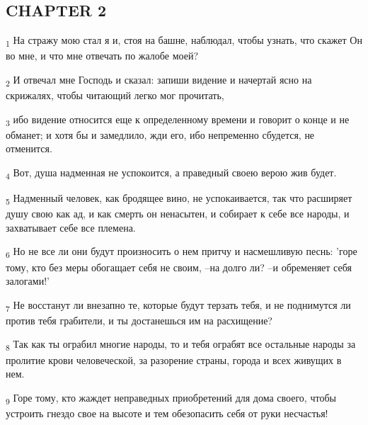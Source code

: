 \subsection{CHAPTER 2}
\begin{tcolorbox}
\textsubscript{1} На стражу мою стал я и, стоя на башне, наблюдал, чтобы узнать, что скажет Он во мне, и что мне отвечать по жалобе моей?
\end{tcolorbox}
\begin{tcolorbox}
\textsubscript{2} И отвечал мне Господь и сказал: запиши видение и начертай ясно на скрижалях, чтобы читающий легко мог прочитать,
\end{tcolorbox}
\begin{tcolorbox}
\textsubscript{3} ибо видение относится еще к определенному времени и говорит о конце и не обманет; и хотя бы и замедлило, жди его, ибо непременно сбудется, не отменится.
\end{tcolorbox}
\begin{tcolorbox}
\textsubscript{4} Вот, душа надменная не успокоится, а праведный своею верою жив будет.
\end{tcolorbox}
\begin{tcolorbox}
\textsubscript{5} Надменный человек, как бродящее вино, не успокаивается, так что расширяет душу свою как ад, и как смерть он ненасытен, и собирает к себе все народы, и захватывает себе все племена.
\end{tcolorbox}
\begin{tcolorbox}
\textsubscript{6} Но не все ли они будут произносить о нем притчу и насмешливую песнь: 'горе тому, кто без меры обогащает себя не своим, --на долго ли? --и обременяет себя залогами!'
\end{tcolorbox}
\begin{tcolorbox}
\textsubscript{7} Не восстанут ли внезапно те, которые будут терзать тебя, и не поднимутся ли против тебя грабители, и ты достанешься им на расхищение?
\end{tcolorbox}
\begin{tcolorbox}
\textsubscript{8} Так как ты ограбил многие народы, то и тебя ограбят все остальные народы за пролитие крови человеческой, за разорение страны, города и всех живущих в нем.
\end{tcolorbox}
\begin{tcolorbox}
\textsubscript{9} Горе тому, кто жаждет неправедных приобретений для дома своего, чтобы устроить гнездо свое на высоте и тем обезопасить себя от руки несчастья!
\end{tcolorbox}
